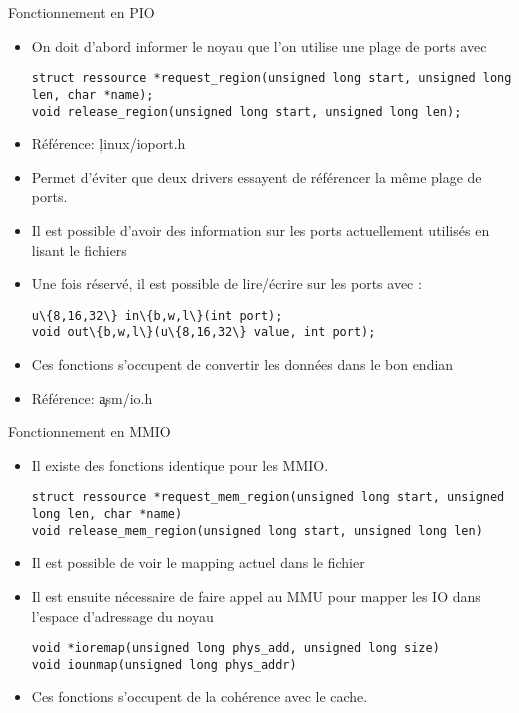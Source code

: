 \begin{frame}[fragile=singleslide]{Fonctionnement en PIO}
  \begin{itemize}
  \item On doit  d'abord informer le noyau que  l'on utilise une plage
    de ports avec
    \begin{lstlisting}
struct ressource *request_region(unsigned long start, unsigned long len, char *name);
void release_region(unsigned long start, unsigned long len);
    \end{lstlisting}
  \item Référence: \c{linux/ioport.h}
  \item  Permet d'éviter que  deux drivers  essayent de  référencer la
    même plage de ports.
  \item  Il  est  possible  d'avoir  des  information  sur  les  ports
    actuellement utilisés en lisant le fichiers 
  \item Une fois réservé, il est possible de lire/écrire sur les ports
    avec :
    \begin{lstlisting}
u\{8,16,32\} in\{b,w,l\}(int port);
void out\{b,w,l\}(u\{8,16,32\} value, int port);
    \end{lstlisting}
  \item Ces fonctions s'occupent de  convertir les données dans le bon
    endian
  \item Référence: \c{asm/io.h}
  \end{itemize}
\end{frame}

\begin{frame}[fragile=singleslide]{Fonctionnement en MMIO}
  \begin{itemize}
  \item Il existe des fonctions identique pour les MMIO.
    \begin{lstlisting}
struct ressource *request_mem_region(unsigned long start, unsigned long len, char *name)
void release_mem_region(unsigned long start, unsigned long len)
    \end{lstlisting}
  \item  Il est possible  de voir  le mapping  actuel dans  le fichier
  \item Il  est ensuite nécessaire de  faire appel au  MMU pour mapper
    les IO dans l'espace d'adressage du noyau
    \begin{lstlisting}
void *ioremap(unsigned long phys_add, unsigned long size)
void iounmap(unsigned long phys_addr)
    \end{lstlisting}
  \item Ces fonctions s'occupent de la cohérence avec le cache.
\end{itemize}
\end{frame}

